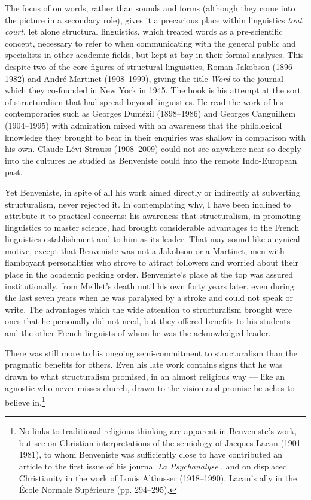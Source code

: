 \documentclass[output=paper]{langscibook}
\begin{document}
The focus of \citet{Benveniste1969vocabulaire} on words, rather than sounds and forms (although they come into the picture in a secondary role), gives it a precarious place within linguistics \emph{tout court}, let alone structural linguistics, which treated words as a pre-scientific concept, necessary to refer to when communicating with the general public and specialists in other academic fields, but kept at bay in their formal analyses. This despite two of the core figures of structural linguistics, Roman Jakobson (1896--1982) and André Martinet (1908--1999), giving the title \emph{Word} to the journal which they co-founded in New York in 1945. The \citeyear{Benveniste1969vocabulaire} book is his attempt at the sort of structuralism that had spread beyond linguistics. He read the work of his contemporaries such as Georges Dumézil (1898--1986) and Georges Canguilhem (1904--1995) with admiration mixed with an awareness that the philological knowledge they brought to bear in their enquiries was shallow in comparison with his own. Claude Lévi-Strauss (1908--2009) could not see anywhere near so deeply into the cultures he studied as Benveniste could into the remote Indo-European past.

Yet Benveniste, in spite of all his work aimed directly or indirectly at subverting structuralism, never rejected it. In contemplating why, I have been inclined to attribute it to practical concerns: his awareness that structuralism, in promoting linguistics to master science, had brought considerable advantages to the French linguistics establishment and to him as its leader. That may sound like a cynical motive, except that Benveniste was not a Jakobson or a Martinet, men with flamboyant personalities who strove to attract followers and worried about their place in the academic pecking order. Benveniste's place at the top was assured institutionally, from Meillet's death until his own forty years later, even during the last seven years when he was paralysed by a stroke and could not speak or write. The advantages which the wide attention to structuralism brought were ones that he personally did not need, but they offered benefits to his students and the other French linguists of whom he was the acknowledged leader.

There was still more to his ongoing semi-commitment to structuralism than the pragmatic benefits for others. Even his late work contains signs that he was drawn to what structuralism promised, in an almost religious way — like an agnostic who never misses church, drawn to the vision and promise he aches to believe in.\footnote{No links to traditional religious thinking are apparent in Benveniste's work, but see \citet[245--247]{Dosse1997} on Christian interpretations of the semiology of Jacques Lacan (1901--1981), to whom Benveniste was sufficiently close to have contributed an article to the first issue of his journal \emph{La Psychanalyse} \citep{Benveniste1956remarques}, and on displaced Christianity in the work of Louis Althusser (1918--1990), Lacan's ally in the École Normale Supérieure (pp. 294--295).}
\end{document}

